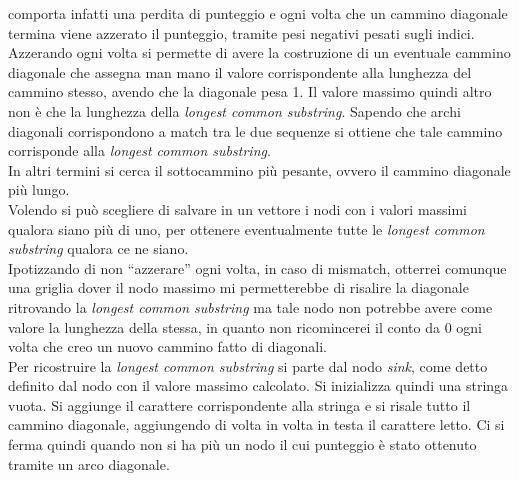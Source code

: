 \documentclass[a4paper,12pt, oneside]{book}
\begin{document}
comporta infatti una perdita di punteggio e ogni volta che un cammino diagonale
termina viene azzerato il punteggio, tramite pesi negativi pesati sugli
indici. Azzerando ogni volta si permette di avere la costruzione di un eventuale
cammino diagonale che assegna man mano il valore corrispondente alla lunghezza
del cammino stesso, avendo che la diagonale pesa 1. Il valore massimo quindi
altro non è che  
la lunghezza della \textit{longest common substring}. Sapendo che archi
diagonali corrispondono a match tra le due sequenze si ottiene che tale cammino
corrisponde alla \textit{longest common substring}. \\
In altri termini si cerca il sottocammino più pesante, ovvero il cammino
diagonale più lungo.\\
Volendo si può scegliere di salvare in un vettore i nodi con i valori massimi
qualora siano più di uno, per ottenere eventualmente tutte le \textit{longest
  common substring} qualora ce ne siano.\\
Ipotizzando di non ``azzerare'' ogni volta, in caso di mismatch, otterrei
comunque una griglia dover il nodo massimo mi permetterebbe di risalire la
diagonale ritrovando la \textit{longest common substring} ma tale nodo non
potrebbe avere come valore la lunghezza della stessa, in quanto non ricomincerei
il conto da 0 ogni volta che creo un nuovo cammino fatto di diagonali.\\
Per ricostruire la \textit{longest common substring} si parte dal nodo
\textit{sink}, come detto definito dal nodo con il valore massimo calcolato. Si
inizializza quindi una stringa vuota. Si aggiunge il 
carattere corrispondente alla stringa e si risale tutto il cammino diagonale,
aggiungendo di volta in volta in testa il carattere letto. Ci si ferma quindi
quando non si ha più un nodo il cui punteggio è stato ottenuto tramite un arco
diagonale. 
\end{document}
